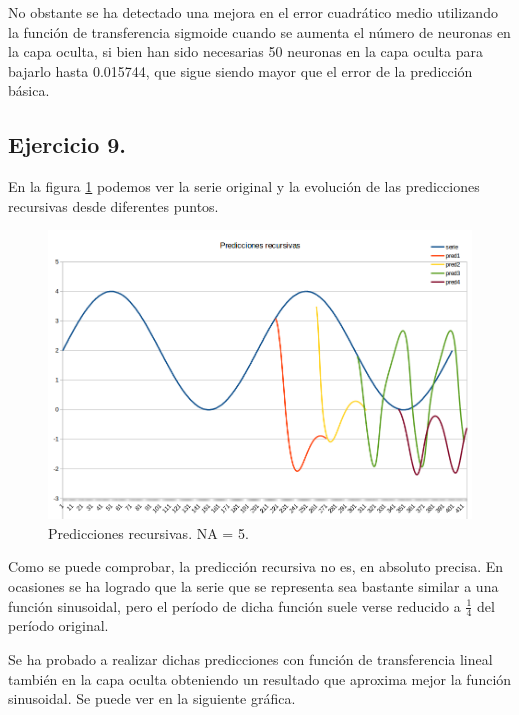 \documentclass[spanish]{assignment}
\begin{document}
	No obstante se ha detectado una mejora en el error cuadrático medio utilizando la función de transferencia sigmoide cuando se aumenta el número de neuronas en la capa oculta, si bien han sido necesarias 50 neuronas en la capa oculta para bajarlo hasta 0.015744, que sigue siendo mayor que el error de la predicción básica.
	
	\subsection{Ejercicio 9.}
	En la figura \ref{recursive_p1} podemos ver la serie original y la evolución de las predicciones recursivas desde diferentes puntos.
		
	\begin{figure}[H]
		\centering
		\includegraphics[scale=0.25]{recursive_p1.png}		
		\caption{Predicciones recursivas. NA = 5.}				
		\label{recursive_p1}
	\end{figure}
		
	Como se puede comprobar, la predicción recursiva no es, en absoluto precisa. En ocasiones se ha logrado que la serie que se representa sea bastante similar a una función sinusoidal, pero el período de dicha función suele verse reducido a $\frac{1}{4}$ del período original.
	
	Se ha probado a realizar dichas predicciones con función de transferencia lineal también en la capa oculta obteniendo un resultado que aproxima mejor la función sinusoidal. Se puede ver en la siguiente gráfica.
	
\end{document}

